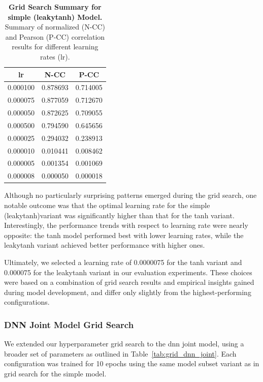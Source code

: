 \begin{table}
    \centering\footnotesize\sf
    \begin{tabular}{ccc}
    \toprule
    lr & N-CC & P-CC \\
    \midrule
    0.000100 & 0.878693 & 0.714005 \\
    0.000075 & 0.877059 & 0.712670 \\
    0.000050 & 0.872625 & 0.709055 \\
    0.000500 & 0.794590 & 0.645656 \\
    0.000025 & 0.294032 & 0.238913 \\
    0.000010 & 0.010441 & 0.008462 \\
    0.000005 & 0.001354 & 0.001069 \\
    0.000008 & 0.000050 & 0.000018 \\
    \bottomrule
    \end{tabular}
    \caption{\textbf{Grid Search Summary for simple (leakytanh) Model.} Summary of normalized (N-CC) and Pearson (P-CC) correlation results for different learning rates (lr).}
    \label{tab:grid_simple_leakytanh}
\end{table}

Although no particularly surprising patterns emerged during the grid search, one notable outcome was that the optimal learning rate for the simple (leakytanh)variant was significantly higher than that for the tanh variant. Interestingly, the performance trends with respect to learning rate were nearly opposite: the tanh model performed best with lower learning rates, while the leakytanh variant achieved better performance with higher ones.

Ultimately, we selected a learning rate of 0.0000075 for the tanh variant and 0.000075 for the leakytanh variant in our evaluation experiments. These choices were based on a combination of grid search results and empirical insights gained during model development, and differ only slightly from the highest-performing configurations.

\subsubsection{DNN Joint Model Grid Search}
\label{subsubsec:dnn_joint_grid_search}
We extended our hyperparameter grid search to the dnn joint model, using a broader set of parameters as outlined in Table~\ref{tab:grid_dnn_joint}. Each configuration was trained for 10 epochs using the same model subset variant as in grid search for the simple model.

